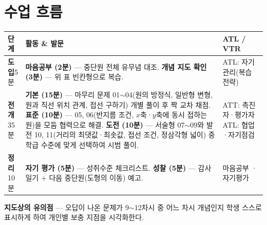 \documentclass[11pt,a4paper]{article}
\begin{document}
\section{수업 흐름}
\begin{tabularx}{\linewidth}{@{}>{\centering\arraybackslash}p{1.6cm}X>{\raggedright\arraybackslash\small}p{3.1cm}@{}}
\toprule
\textbf{단계} & \textbf{활동 \& 발문} & \textbf{ATL / VTR} \\
\midrule
\textcolor{goldstrong}{\textbf{도입}}\newline\footnotesize 5분 &
\textbf{마음공부 (2분)} --- 중단원 전체 유무념 대조.\newline
\textbf{개념 지도 확인 (3분)} --- 위 표 빈칸형으로 복습. &
ATL: 자기관리(복습 전략) \\
\addlinespace
\textcolor{goldstrong}{\textbf{전개}}\newline\footnotesize 35분 &
\textbf{기본 (15분)} --- 마무리 문제 01$\sim$04(원의 방정식, 일반형 변형, 원과 직선 위치 관계, 접선 구하기) 개별 풀이 후 짝 교차 채점.\newline
\textbf{표준 (10분)} --- 05, 06(반지름 조건, $x$축·$y$축에 동시 접하는 원)을 모둠 협력으로 해결.\newline
\textbf{도전 (10분)} --- 서술형 07$\sim$09와 발전 10, 11(거리의 최댓값·최솟값, 접선 조건, 정삼각형 넓이) 중 학급 수준에 맞게 선택하여 시범 풀이. &
ATT: 촉진자·평가자\newline ATL: 협업·자기점검 \\
\addlinespace
\textcolor{goldstrong}{\textbf{정리}}\newline\footnotesize 10분 &
\textbf{자기 평가 (5분)} --- 성취수준 체크리스트.\newline
\textbf{성찰 (5분)} --- 감사 일기 + 다음 중단원(도형의 이동) 예고. &
마음공부 · 자기평가 \\
\bottomrule
\end{tabularx}

\begin{calloutbox}
\textbf{지도상의 유의점} --- 오답이 나온 문제가 9$\sim$12차시 중 어느 차시 개념인지 학생 스스로 표시하게 하여 개인별 보충 지점을 시각화한다.
\end{calloutbox}
\end{document}
